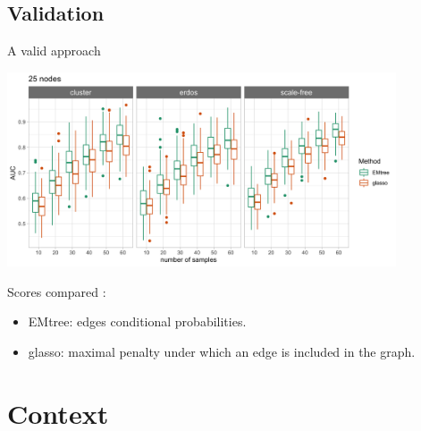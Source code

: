 \documentclass[11pt]{beamer}
\newcommand{\bleu}[1]{\textcolor{Framableulight}{#1}}
\begin{document}
\subsection{Validation}
\begin{frame}{A valid approach}
\begin{center}
\includegraphics[width=11.5cm]{compare_glasso_penalty.png}
\end{center}
\footnotesize
Scores compared :
\begin{itemize}
\item EMtree: edges conditional probabilities.
\item glasso: maximal penalty under which an edge is included in the graph.
\end{itemize}
\end{frame}
\section{}
\subsection{}

\begin{frame}
\center{\Huge\bleu{With abundance data}}
\end{frame}
\section{Context}
\end{document}
